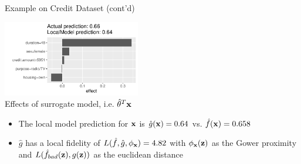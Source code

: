 \documentclass[11pt,compress,t,notes=noshow, aspectratio=169, xcolor=table]{beamer}
\newcommand{\pih}{\fh}
\newcommand{\gh}{\hat{g}}
\begin{document}
\begin{frame}[c]{Example on Credit Dataset (cont'd)}


\begin{center}
	\includegraphics[width=0.45\textwidth]{figure/lime_credit.pdf}\\
	{Effects of surrogate model, i.e. $\hat{\theta}^T \mathbf{x}$}
\end{center}

\begin{itemize}
	\item The local model prediction for $\mathbf{x}$ is $\gh(\xv) = 0.64$ vs. $\hat{f}(\mathbf{x}) = 0.658$ 
	\item $\gh$ has a local fidelity of $L(\pih, \gh, \neigh) = 4.82$ with $\phi_{\mathbf{x}}(\mathbf{z})$ as the Gower proximity and $L(\pih_{bad}(\zv), g(\zv))$ as the euclidean distance 
\end{itemize}

\end{frame}
	
\end{document}
